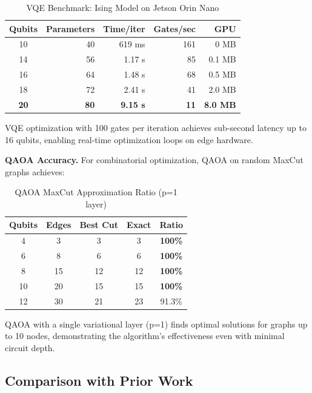 \begin{table}[t]
\caption{VQE Benchmark: Ising Model on Jetson Orin Nano}
\centering
\small
\begin{tabular}{crrrr}
\toprule
\textbf{Qubits} & \textbf{Parameters} & \textbf{Time/iter} & \textbf{Gates/sec} & \textbf{GPU} \\
\midrule
10 & 40 & 619 ms & 161 & 0 MB \\
14 & 56 & 1.17 s & 85 & 0.1 MB \\
16 & 64 & 1.48 s & 68 & 0.5 MB \\
18 & 72 & 2.41 s & 41 & 2.0 MB \\
\textbf{20} & \textbf{80} & \textbf{9.15 s} & \textbf{11} & \textbf{8.0 MB} \\
\bottomrule
\end{tabular}
\label{tab:vqe_motivation}
\end{table}

VQE optimization with 100 gates per iteration achieves sub-second latency up to 16 qubits, enabling real-time optimization loops on edge hardware.

\textbf{QAOA Accuracy.} For combinatorial optimization, QAOA on random MaxCut graphs achieves:

\begin{table}[t]
\caption{QAOA MaxCut Approximation Ratio (p=1 layer)}
\centering
\small
\begin{tabular}{ccccc}
\toprule
\textbf{Qubits} & \textbf{Edges} & \textbf{Best Cut} & \textbf{Exact} & \textbf{Ratio} \\
\midrule
4 & 3 & 3 & 3 & \textbf{100\%} \\
6 & 8 & 6 & 6 & \textbf{100\%} \\
8 & 15 & 12 & 12 & \textbf{100\%} \\
10 & 20 & 15 & 15 & \textbf{100\%} \\
12 & 30 & 21 & 23 & 91.3\% \\
\bottomrule
\end{tabular}
\label{tab:qaoa_motivation}
\end{table}

QAOA with a single variational layer (p=1) finds optimal solutions for graphs up to 10 nodes, demonstrating the algorithm's effectiveness even with minimal circuit depth.

\subsection{Comparison with Prior Work}

